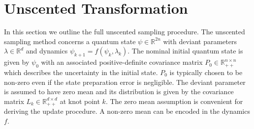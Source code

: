 \section{Unscented Transformation}
\label{appendix:unscented}
In this section we outline the full unscented sampling procedure.
The unscented sampling method concerns a quantum state $\psi \in \mathbb{R}^{2n}$ with
deviant parameters $\lambda \in \mathbb{R}^{d}$ and dynamics $\psi_{k + 1} = f(\psi_{k}, \lambda_{k})$.
The nominal initial quantum state is given by $\psi_{0}$ with an associated
positive-definite covariance matrix $P_{0} \in \mathbb{R}_{++}^{n \times n}$
which describes the uncertainty in the initial state.
$P_{0}$ is typically chosen to be non-zero even if the state preparation error is negligible.
The deviant parameter
is assumed to have zero mean and its distribution is given by the covariance matrix
$L_{k} \in \mathbb{R}_{++}^{d \times d}$ at knot point $k$. The zero mean assumption
is convenient for deriving the update procedure. A non-zero mean can be encoded
in the dynamics $f$.

